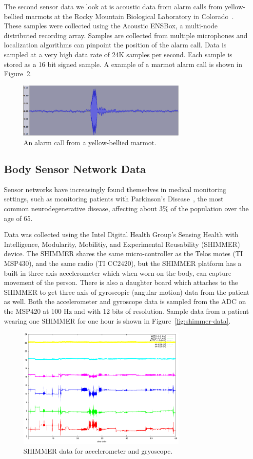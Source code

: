 The second sensor data we look at is acoustic data from alarm calls
from yellow-bellied marmots at the Rocky Mountain Biological
Laboratory in Colorado~\cite{girod-marmots}.  These samples were
collected using the Acoustic ENSBox, a multi-node distributed
recording array.  Samples are collected from multiple microphones and
localization algorithms can pinpoint the position of the alarm call.
Data is sampled at a very high data rate of 24K samples per second.
Each sample is stored as a 16 bit signed sample.  A example of a
marmot alarm call is shown in Figure~\ref{fig:marmot-data}. 

\begin{figure}[h]
  \centering
  \includegraphics[width=0.75\textwidth]{figures/marmot-data.png} 
  \caption{An alarm call from a yellow-bellied marmot.}
  \label{fig:marmot-data}
\end{figure}

\subsection{Body Sensor Network Data}

Sensor networks have increasingly found themselves in medical
monitoring settings, such as monitoring patients with Parkinson's
Disease~\cite{parkinsons-embs07}, the most common neurodegenerative
disease, affecting about 3\% of the population over the age of 65.

Data was collected using the Intel Digital Health Group's Sensing
Health with Intelligence, Modularity, Mobilitiy, and Experimental
Reusability (SHIMMER) device.  The SHIMMER shares the same
micro-controller as the Telos motes (TI MSP430), and the same radio
(TI CC2420), but the SHIMMER platform has a built in three axis
accelerometer which when worn on the body, can capture movement of the
person.  There is also a daughter board which attaches to the SHIMMER
to get three axis of gyroscopic (angular motion) data from the patient
as well.  Both the accelerometer and gyroscope data is sampled from
the ADC on the MSP420 at 100 Hz and with 12 bits of resolution.
Sample data from a patient wearing one SHIMMER for one hour is shown
in Figure~\ref{fig:shimmer-data}.

\begin{figure}[h]
  \centering
  \includegraphics[width=0.75\textwidth]{figures/shimmer-data.png} 
  \caption{SHIMMER data for accelerometer and gryoscope.}
  \label{fig:marmot-data}
\end{figure}


